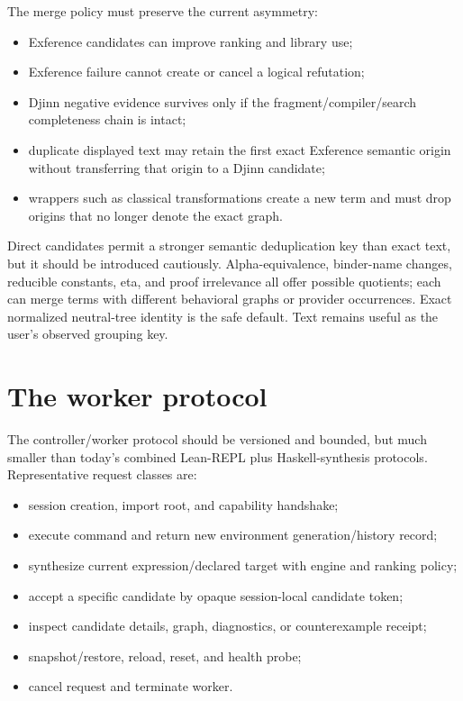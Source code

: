\documentclass[10pt,letterpaper,oneside]{report}
\newcommand{\code}[1]{\texttt{\detokenize{#1}}}
\begin{document}
The merge policy must preserve the current asymmetry:

\begin{itemize}
  \item Exference candidates can improve ranking and library use;
  \item Exference failure cannot create or cancel a logical refutation;
  \item Djinn negative evidence survives only if the fragment/compiler/search completeness chain is intact;
  \item duplicate displayed text may retain the first exact Exference semantic origin without transferring that origin to a Djinn candidate;
  \item wrappers such as classical transformations create a new term and must drop origins that no longer denote the exact graph.
\end{itemize}

Direct \code{Expr} candidates permit a stronger semantic deduplication key than exact text, but it should be introduced cautiously. Alpha-equivalence, binder-name changes, reducible constants, eta, and proof irrelevance all offer possible quotients; each can merge terms with different behavioral graphs or provider occurrences. Exact normalized neutral-tree identity is the safe default. Text remains useful as the user's observed grouping key.

\section{The worker protocol}

The controller/worker protocol should be versioned and bounded, but much smaller than today's combined Lean-REPL plus Haskell-synthesis protocols. Representative request classes are:

\begin{itemize}
  \item session creation, import root, and capability handshake;
  \item execute command and return new environment generation/history record;
  \item synthesize current expression/declared target with engine and ranking policy;
  \item accept a specific candidate by opaque session-local candidate token;
  \item inspect candidate details, graph, diagnostics, or counterexample receipt;
  \item snapshot/restore, reload, reset, and health probe;
  \item cancel request and terminate worker.
\end{itemize}
\end{document}
